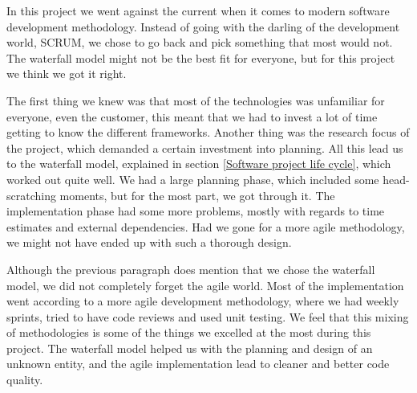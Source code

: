 In this project we went against the current when it comes to modern software development methodology. Instead of going with the darling of the development world, SCRUM, we chose to go back and pick something that most would not. The waterfall model might not be the best fit for everyone, but for this project we think we got it right.

The first thing we knew was that most of the technologies was unfamiliar for everyone, even the customer, this meant that we had to invest a lot of time getting to know the different frameworks. Another thing was the research focus of the project, which demanded a certain investment into planning. All this lead us to the waterfall model, explained in section \ref{Software project life cycle}, which worked out quite well. We had a large planning phase, which included some head-scratching moments, but for the most part, we got through it. The implementation phase had some more problems, mostly with regards to time estimates and external dependencies. Had we gone for a more agile methodology, we might not have ended up with such a thorough design.

Although the previous paragraph does mention that we chose the waterfall model, we did not completely forget the agile world. Most of the implementation went according to a more agile development methodology, where we had weekly sprints, tried to have code reviews and used unit testing. We feel that this mixing of methodologies is some of the things we excelled at the most during this project. The waterfall model helped us with the planning and design of an unknown entity, and the agile implementation lead to cleaner and better code quality.
